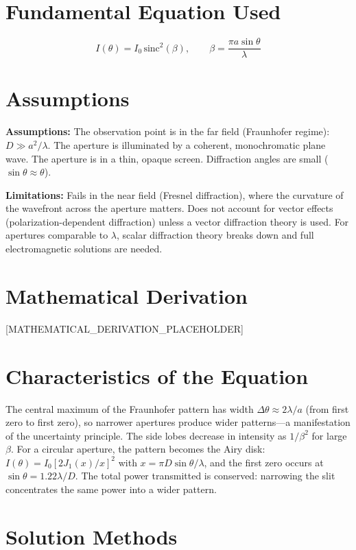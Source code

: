 \documentclass[11pt,openright]{book}
\begin{document}
\section*{Fundamental Equation Used}

\[
I(\theta) = I_0\,\text{sinc}^2(\beta),\qquad \beta = \frac{\pi a \sin\theta}{\lambda}
\]
\section*{Assumptions}

\textbf{Assumptions:} The observation point is in the far field (Fraunhofer regime): $D \gg a^2/\lambda$. The aperture is illuminated by a coherent, monochromatic plane wave. The aperture is in a thin, opaque screen. Diffraction angles are small ($\sin\theta \approx \theta$).


\textbf{Limitations:} Fails in the near field (Fresnel diffraction), where the curvature of the wavefront across the aperture matters. Does not account for vector effects (polarization-dependent diffraction) unless a vector diffraction theory is used. For apertures comparable to $\lambda$, scalar diffraction theory breaks down and full electromagnetic solutions are needed.


\section*{Mathematical Derivation}

[MATHEMATICAL_DERIVATION_PLACEHOLDER]

\section*{Characteristics of the Equation}

The central maximum of the Fraunhofer pattern has width $\Delta\theta \approx 2\lambda/a$ (from first zero to first zero), so narrower apertures produce wider patterns---a manifestation of the uncertainty principle. The side lobes decrease in intensity as $1/\beta^2$ for large $\beta$. For a circular aperture, the pattern becomes the Airy disk: $I(\theta) = I_0\left[2J_1(x)/x\right]^2$ with $x = \pi D \sin\theta/\lambda$, and the first zero occurs at $\sin\theta = 1.22\lambda/D$. The total power transmitted is conserved: narrowing the slit concentrates the same power into a wider pattern.
\section*{Solution Methods}
\end{document}
